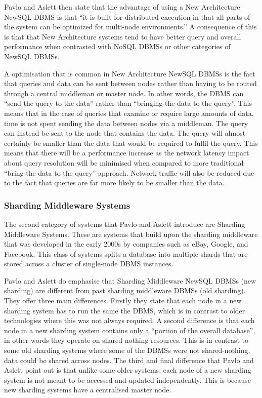 \documentclass[10pt, conference]{IEEEtran}
\begin{document}
Pavlo and Aslett then state that the advantage of using a New Architecture NewSQL DBMS is that ``it is built for distributed execution in that all parts of the system can be optimized for multi-node environments.'' A consequence of this is that that New Architecture systems tend to have better query and overall performance when contrasted with NoSQL DBMSs or other categories of NewSQL DBMSs. 

A optimisation that is common in New Architecture NewSQL DBMSs is the fact that queries and data can be sent between nodes rather than having to be routed through a central middleman or master node. In other words, the DBMS can ``send the query to the data'' rather than ``bringing the data to the query''. This means that in the case of queries that examine or require large amounts of data, time is not spent sending the data between nodes via a middleman. The query can instead be sent to the node that contains the data. The query will almost certainly be smaller than the data that would be required to fulfil the query. This means that there will be a performance increase as the network latency impact about query resolution will be minimised when compared to more traditional ``bring the data to the query'' approach. Network traffic will also be reduced due to the fact that queries are far more likely to be smaller than the data.

\subsubsection{Sharding Middleware Systems}

The second category of systems that Pavlo and Aslett introduce are Sharding Middleware Systems. These are systems that build upon the sharding middleware that was developed in the early 2000s by companies such as eBay, Google, and Facebook. This class of systems splits a database into multiple shards that are stored across a cluster of single-node DBMS instances.

Pavlo and Aslett do emphasise that Sharding Middleware NewSQL DBMSs (new sharding) are different from past sharding middleware DBMSs (old sharding). They offer three main differences. Firstly they state that each node in a new sharding system has to run the same the DBMS, which is in contrast to older technologies where this was not always required. A second difference is that each node in a new sharding system contains only a ``portion of the overall database'', in other words they operate on shared-nothing resources. This is in contrast to some old sharding systems where some of the DBMSs were not shared-nothing, data could be shared across nodes. The third and final difference that Pavlo and Aslett point out is that unlike some older systems, each node of a new sharding system is not meant to be accessed and updated independently. This is because new sharding systems have a centralised master node.
\end{document}
